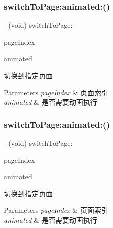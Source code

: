 \subsubsection{\texorpdfstring{switch\+To\+Page\+:animated\+:()}{switchToPage:animated:()}\hspace{0.1cm}{\footnotesize\ttfamily [2/3]}}
{\footnotesize\ttfamily -\/ (void) switch\+To\+Page\+: \begin{DoxyParamCaption}\item[{(N\+S\+U\+Integer)}]{page\+Index }\item[{animated:(B\+O\+OL)}]{animated }\end{DoxyParamCaption}}

切换到指定页面


\begin{DoxyParams}{Parameters}
{\em page\+Index} & 页面索引 \\
\hline
{\em animated} & 是否需要动画执行 \\
\hline
\end{DoxyParams}
\mbox{\label{interface_v_t_magic_controller_aa1d4db425d8e4c189aabba581bec2c7f}} 
\subsubsection{\texorpdfstring{switch\+To\+Page\+:animated\+:()}{switchToPage:animated:()}\hspace{0.1cm}{\footnotesize\ttfamily [3/3]}}
{\footnotesize\ttfamily -\/ (void) switch\+To\+Page\+: \begin{DoxyParamCaption}\item[{(N\+S\+U\+Integer)}]{page\+Index }\item[{animated:(B\+O\+OL)}]{animated }\end{DoxyParamCaption}}

切换到指定页面


\begin{DoxyParams}{Parameters}
{\em page\+Index} & 页面索引 \\
\hline
{\em animated} & 是否需要动画执行 \\
\hline
\end{DoxyParams}
\mbox{\label{interface_v_t_magic_controller_af1fc3321dd2ba20039f764b858a5492b}} 
